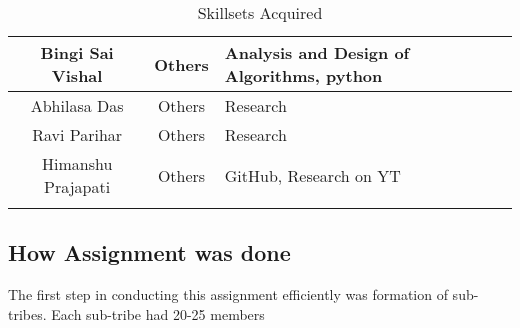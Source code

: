 \begin{center}
\begin{longtable}{ | c | c | m{6cm} | }
        \hline
        Bingi Sai Vishal           & Others            & Analysis and Design of Algorithms, python                               \\
        \hline
        Abhilasa Das               & Others            & Research                                                                \\
        \hline
        Ravi Parihar               & Others            & Research                                                                \\
        \hline
        Himanshu Prajapati         & Others            & GitHub, Research on YT                                                  \\
        \hline


        \hline
        \caption{Skillsets Acquired}
    \end{longtable}
\end{center}

\subsection{How Assignment was done}


The first step in conducting this assignment efficiently was formation of sub-tribes. Each sub-tribe had 20-25 members




